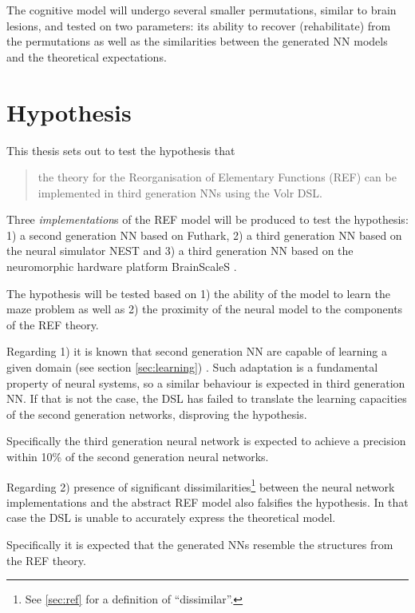 \documentclass[report.tex]{subfiles}
\begin{document}
The cognitive model will undergo several smaller permutations, similar
to brain lesions, and tested on two parameters: 
  its ability to recover (rehabilitate) from the permutations
  as well as
  the similarities between the generated \gls{NN} models and the
  theoretical expectations.

\section{Hypothesis} \label{ref:hypothesis}
This thesis sets out to test the hypothesis that
\begin{quote}
the theory for the Reorganisation of Elementary Functions
(\gls{REF}) can be implemented in third generation \gls{NN}s using
the Volr \gls{DSL}.
\end{quote}

Three \textit{implementation}s of the \gls{REF} model will be
produced to test the hypothesis: 
  1) a second generation \gls{NN} based on Futhark, 
  2) a third generation \gls{NN} based on the neural simulator \gls{NEST} and
  3) a third generation \gls{NN} based on the neuromorphic 
     hardware platform BrainScaleS .

The hypothesis will be tested based on
1) the ability of the model to learn the maze problem as well as 
2) the proximity of the neural model to the components of the
   \gls{REF} theory.

Regarding 1) it is known that second generation \gls{NN} are
capable of learning a given domain (see section \ref{sec:learning})
\cite{Russel2007}.
Such adaptation is a fundamental property of neural systems, so a
similar behaviour is expected in third generation \gls{NN}.
If that is not the case, the \gls{DSL} has failed to translate
the learning capacities of the second generation networks,
disproving the hypothesis.

Specifically the third generation neural network is expected to
achieve a precision within 10\% of the second generation neural 
networks.

Regarding 2) presence of significant
dissimilarities\footnote{See \ref{sec:ref} for a definition of
\enquote{dissimilar}.} between the neural network implementations 
and the abstract \gls{REF} model also falsifies the hypothesis. 
In that case the \gls{DSL} is unable to accurately express the
theoretical model.

Specifically it is expected that the generated \gls{NN}s resemble
the structures from the \gls{REF} theory.
\end{document}
